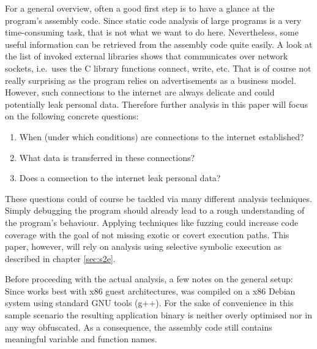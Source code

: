 For a general overview, often a good first step is to have a glance at the program's assembly code.
Since static code analysis of large programs is a very time-consuming task, that is not what we want to do here.
Nevertheless, some useful information can be retrieved from the assembly code quite easily.
A look at the list of invoked external libraries shows that \app communicates over network sockets, i.e.~uses the C library functions connect, write, etc.
That is of course not really surprising as the program relies on advertisements as a business model.
However, such connections to the internet are always delicate and could potentially leak personal data.
Therefore further analysis in this paper will focus on the following concrete questions:
\begin{enumerate}
  \item When (under which conditions) are connections to the internet established?
  \item What data is transferred in these connections?
  \item Does a connection to the internet leak personal data?
\end{enumerate}
These questions could of course be tackled via many different analysis techniques.
Simply debugging the program should already lead to a rough understanding of the program's behaviour.
Applying techniques like fuzzing  could increase code coverage with the goal of not missing exotic or covert execution paths.
This paper, however, will rely on analysis using selective symbolic execution as described in chapter \ref{sec:s2e}.

\bigskip

Before proceeding with the actual analysis, a few notes on the general setup: 
Since \sse works best with x86 guest architectures, \app was compiled on a x86 Debian system using standard GNU tools (g++).
For the sake of convenience in this sample scenario the resulting application binary is neither overly optimised nor in any way obfuscated.
As a consequence, the assembly code still contains meaningful variable and function names.


\iffalse
§4	Project idea: explore privacy issues in a sample binary
		> Plan darlegen: Programme könnten unerwünscht Infos preisgeben.
		> Daher: Eigenes kleines Programm, das … macht.
\fi